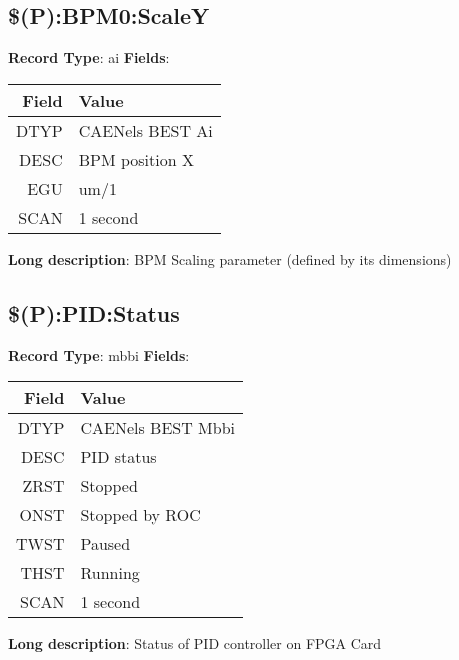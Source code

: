 \subsection{\$(P):BPM0:ScaleY}
\textbf{Record Type}: ai \newline \newline 
\textbf{Fields}: \newline 
\begin{tabularx}{0.7\linewidth}{|r|X|}
\hline Field & Value \\
\hline
\hline
DTYP & CAENels BEST Ai\\
\hline
DESC & BPM position X\\
\hline
EGU & um/1\\
\hline
SCAN & 1 second\\
\hline
\end{tabularx}
\newline \newline \newline
\textbf{Long description}: \newline 
 BPM Scaling parameter (defined by its dimensions)
\newline \newline


\subsection{\$(P):PID:Status}
\textbf{Record Type}: mbbi \newline \newline 
\textbf{Fields}: \newline 
\begin{tabularx}{0.7\linewidth}{|r|X|}
\hline Field & Value \\
\hline
\hline
DTYP & CAENels BEST Mbbi\\
\hline
DESC & PID status\\
\hline
ZRST & Stopped\\
\hline
ONST & Stopped by ROC\\
\hline
TWST & Paused\\
\hline
THST & Running\\
\hline
SCAN & 1 second\\
\hline
\end{tabularx}
\newline \newline \newline
\textbf{Long description}: \newline 
 Status of PID controller on FPGA Card
\newline \newline


